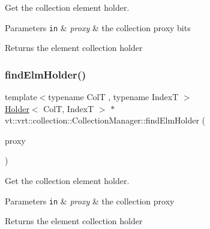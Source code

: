 Get the collection element holder. 


\begin{DoxyParams}[1]{Parameters}
\mbox{\tt in}  & {\em proxy} & the collection proxy bits\\
\hline
\end{DoxyParams}
\begin{DoxyReturn}{Returns}
the element collection holder 
\end{DoxyReturn}
\mbox{\label{structvt_1_1vrt_1_1collection_1_1_collection_manager_aa7f2e2fbbd73a3d7111904c0b31807e6}} 
\subsubsection{\texorpdfstring{find\+Elm\+Holder()}{findElmHolder()}\hspace{0.1cm}{\footnotesize\ttfamily [2/2]}}
{\footnotesize\ttfamily template$<$typename ColT , typename IndexT $>$ \\
\hyperlink{structvt_1_1vrt_1_1collection_1_1_holder}{Holder}$<$ ColT, IndexT $>$ $\ast$ vt\+::vrt\+::collection\+::\+Collection\+Manager\+::find\+Elm\+Holder (\begin{DoxyParamCaption}\item[{\hyperlink{structvt_1_1vrt_1_1collection_1_1_collection_manager_a56458ed7f9bb22b631b9b3a745f42f94}{Collection\+Proxy\+Wrap\+Type}$<$ ColT $>$}]{proxy }\end{DoxyParamCaption})\hspace{0.3cm}{\ttfamily [private]}}



Get the collection element holder. 


\begin{DoxyParams}[1]{Parameters}
\mbox{\tt in}  & {\em proxy} & the collection proxy\\
\hline
\end{DoxyParams}
\begin{DoxyReturn}{Returns}
the element collection holder 
\end{DoxyReturn}
\mbox{\label{structvt_1_1vrt_1_1collection_1_1_collection_manager_a9275a4f6a7c33389813ba7fe4cc75d7e}} 
